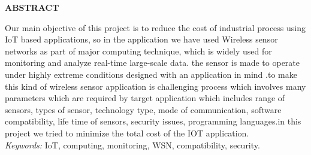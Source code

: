\newpage
\newpage
{}
\begin{center}
{\large \bf ABSTRACT}
\end{center}
Our main objective of this project is to reduce the cost of industrial process using IoT based applications, so in the application we have used Wireless sensor networks as part of major computing technique, which is widely used for monitoring and analyze real-time large-scale data. the sensor is made to operate under highly extreme conditions designed with an application in mind .to make this kind of wireless sensor application is challenging process which involves many parameters which are required by target application which includes range of sensors, types of sensor, technology type, mode of communication, software compatibility, life time of sensors, security issues, programming languages.in this project we tried to minimize the total cost of the IOT application.  \\

{\it Keywords:} IoT, computing, monitoring, WSN, compatibility, security.
